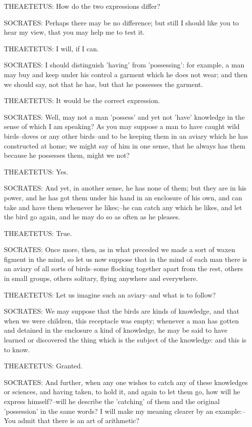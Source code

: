 THEAETETUS: How do the two expressions differ?

SOCRATES: Perhaps there may be no difference; but still I should like
you to hear my view, that you may help me to test it.

THEAETETUS: I will, if I can.

SOCRATES: I should distinguish 'having' from 'possessing': for example,
a man may buy and keep under his control a garment which he does not
wear; and then we should say, not that he has, but that he possesses the
garment.

THEAETETUS: It would be the correct expression.

SOCRATES: Well, may not a man 'possess' and yet not 'have' knowledge
in the sense of which I am speaking? As you may suppose a man to have
caught wild birds--doves or any other birds--and to be keeping them in
an aviary which he has constructed at home; we might say of him in one
sense, that he always has them because he possesses them, might we not?

THEAETETUS: Yes.

SOCRATES: And yet, in another sense, he has none of them; but they are
in his power, and he has got them under his hand in an enclosure of his
own, and can take and have them whenever he likes;--he can catch any
which he likes, and let the bird go again, and he may do so as often as
he pleases.

THEAETETUS: True.

SOCRATES: Once more, then, as in what preceded we made a sort of waxen
figment in the mind, so let us now suppose that in the mind of each man
there is an aviary of all sorts of birds--some flocking together apart
from the rest, others in small groups, others solitary, flying anywhere
and everywhere.

THEAETETUS: Let us imagine such an aviary--and what is to follow?

SOCRATES: We may suppose that the birds are kinds of knowledge, and that
when we were children, this receptacle was empty; whenever a man has
gotten and detained in the enclosure a kind of knowledge, he may be
said to have learned or discovered the thing which is the subject of the
knowledge: and this is to know.

THEAETETUS: Granted.

SOCRATES: And further, when any one wishes to catch any of these
knowledges or sciences, and having taken, to hold it, and again to let
them go, how will he express himself?--will he describe the 'catching'
of them and the original 'possession' in the same words? I will make
my meaning clearer by an example:--You admit that there is an art of
arithmetic?


